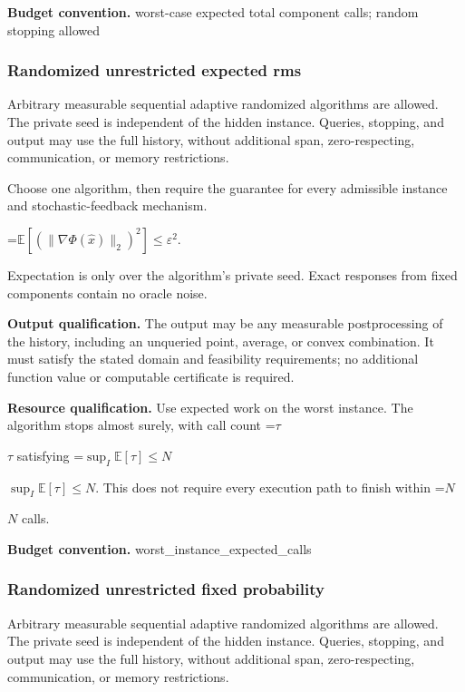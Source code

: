 \documentclass[10pt,a4paper]{article}
\newcommand{\AtlasMath}[1]{\par\begingroup\centering\setbox0=\hbox{$\displaystyle #1$}\ifdim\wd0>1.4\linewidth\typeout{ATLAS WIDE FORMULA: \the\wd0}\fi\ifdim\wd0>\linewidth\resizebox{\linewidth}{!}{\box0}\else\box0\fi\par\endgroup}
\newcommand{\AtlasInlineMath}[1]{\begingroup\setbox0=\hbox{$#1$}\ifdim\wd0>.4\linewidth\endgroup\AtlasMath{#1}\else\endgroup$#1$\fi}
\begin{document}
\textbf{Budget convention.} worst-case expected total component calls; random stopping allowed



\subsubsection{Randomized unrestricted expected rms}


Arbitrary measurable sequential adaptive randomized algorithms are allowed. The private seed is independent of the hidden instance. Queries, stopping, and output may use the full history, without additional span, zero-respecting, communication, or memory restrictions.



Choose one algorithm, then require the guarantee for every admissible instance and stochastic-feedback mechanism.




\AtlasMath{\mathbb{E}\!\left[\left(\|\nabla\Phi(\widehat{x})\|_2\right)^2\right]\le\varepsilon^2.}




Expectation is only over the algorithm's private seed. Exact responses from fixed components contain no oracle noise.



\textbf{Output qualification.} The output may be any measurable postprocessing of the history, including an unqueried point, average, or convex combination. It must satisfy the stated domain and feasibility requirements; no additional function value or computable certificate is required.



\textbf{Resource qualification.} Use expected work on the worst instance. The algorithm stops almost surely, with call count \AtlasInlineMath{\tau} satisfying \AtlasInlineMath{\sup_I\mathbb{E}[\tau]\le N}. This does not require every execution path to finish within \AtlasInlineMath{N} calls.



\textbf{Budget convention.} worst\_instance\_expected\_calls



\subsubsection{Randomized unrestricted fixed probability}


Arbitrary measurable sequential adaptive randomized algorithms are allowed. The private seed is independent of the hidden instance. Queries, stopping, and output may use the full history, without additional span, zero-respecting, communication, or memory restrictions.
\end{document}
